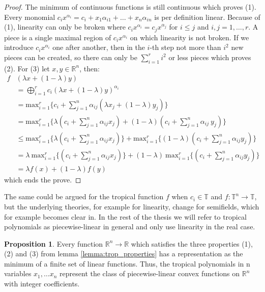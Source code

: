 \documentclass{article}
\theoremstyle{definition}
\newtheorem{proposition}[theorem]{Proposition}
\begin{document}
\begin{proof}
The minimum of continuous functions is still continuous which proves (1). Every monomial $c_ix^{\alpha_i} = c_i + x_{1}\alpha_{i1} + \dots + x_n \alpha_{in}$ is per definition linear. Because of (1), linearity can only be broken where $c_i x^{\alpha_i} = c_j x^{\alpha_j}$ for $i \leq j$ and $i,j = 1, \dots ,r$. A piece is a single maximal region of $c_ix^{\alpha_i}$ on which linearity is not broken. If we introduce $c_ix^{\alpha_i}$ one after another, then in the $i$-th step not more than $i^2$ new pieces can be created, so there can only be $ \sum_{i=1}^{r} i^2$ or less pieces which proves (2). 
For (3) let $x, y \in \mathbb{R}^{n}$, then:
\begin{align*}
f&(\lambda x + (1-\lambda)y) \\
&= \bigoplus^{r}_{i=1} c_{i}(\lambda x + (1-\lambda) y)^{\alpha_{i}} \\
&= \text{max}^{r}_{i=1} \{ c_{i} + \sum_{j=1}^{n} \alpha_{ij}(\lambda x_{j} + (1-\lambda) y_{j}) \} \\
&= \text{max}^{r}_{i=1} \{ \lambda (c_{i} + \sum_{j=1}^{n}\alpha_{ij}x_{j}) + (1-\lambda) (c_{i} + \sum_{j=1}^{n}\alpha_{ij} \ y_{j})\} \\
&\leq \text{max}^{r}_{i=1} \{ \lambda (c_{i} + \sum_{j=1}^{n}\alpha_{ij}x_{j}) \} + \text{max}^{r}_{i=1} \{ (1-\lambda) (c_{i} + \sum_{j=1}^{n}\alpha_{ij}y_{j}) \} \\
&= \lambda \ \text{max}^{r}_{i=1} \{ (c_{i} + \sum_{j=1}^{n}\alpha_{ij}x_{j}) \} + (1-\lambda) \ \text{max}^{r}_{i=1} \{ (c_{i} + \sum_{j=1}^{n}\alpha_{ij}y_{j}) \} \\
&= \lambda f(x) + (1-\lambda) f(y)
\end{align*}
which ends the prove.
\end{proof}

The same could be argued for the tropical function $f$ when $c_{i} \in \mathbb{T}$ and $f:\mathbb{T}^{n} \to \mathbb{T}$, but the underlying theories, for example for linearity, change for semifields, which for example becomes clear in\cite{olia2020analysis}. In the rest of the thesis we will refer to tropical polynomials as piecewise-linear in general and only use linearity in the real case.

\begin{proposition}
Every function $\mathbb{R}^{n} \to \mathbb{R}$ which satisfies the three properties (1), (2) and (3) from lemma 	\ref{lemma:trop_properties} has a representation as the minimum of a finite set of linear functions. Thus, the tropical polynomials in n variables $x_{1}, \dots x_{n}$ represent the class of piecewise-linear convex functions on $\mathbb{R}^{n}$ with integer coefficients.
\end{proposition}
\end{document}
